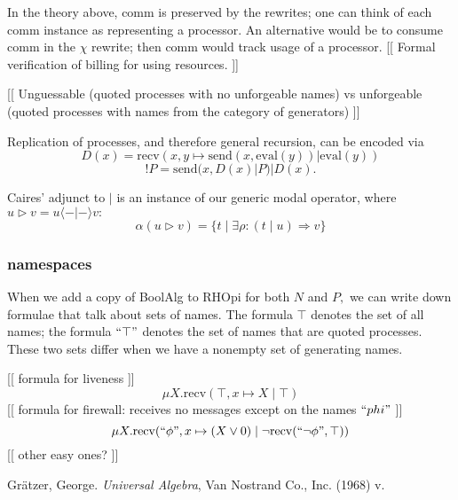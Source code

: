 \documentclass{article}
\newcommand{\maps}{\colon}
\newcommand{\send}{\mathrm{send}}
\newcommand{\recv}{\mathrm{recv}}
\renewcommand{\quote}[1]{``#1"}
\newcommand{\deref}[1]{\mathrm{eval}(#1)}
\begin{document}
In the theory above, comm is preserved by the rewrites; one can think of each comm instance as representing a processor.  An alternative would be to consume comm in the $\chi$ rewrite; then comm would track usage of a processor.  [[ Formal verification of billing for using resources. ]]

[[ Unguessable (quoted processes with no unforgeable names) vs unforgeable (quoted processes with names from the category of generators) ]]

Replication of processes, and therefore general recursion, can be encoded via
\[D(x) = \recv(x, y\mapsto \send(x, \deref{y}) | \deref{y})\]
\[!P = \send(x, D(x) | P) | D(x).\]

Caires' adjunct to $|$ is an instance of our generic modal operator, where $u \triangleright v = u \langle - | - \rangle v:$
\[ \alpha(u \triangleright v) = \{ t \;|\; \exists \rho\maps (t\;|\;u) \Rightarrow v\} \]

\subsubsection{namespaces}

When we add a copy of BoolAlg to RHOpi for both $N$ and $P,$ we can write down formulae that talk about sets of names.  The formula $\top$ denotes the set of all names; the formula $\quote{\top}$ denotes the set of names that are quoted processes.  These two sets differ when we have a nonempty set of generating names.

[[ formula for liveness ]]
\[ \mu X. \recv(\top, x \mapsto X\;|\;\top) \]
[[ formula for firewall: receives no messages except on the names $\quote{phi}$ ]]
\[ \mu X. \recv(\quote{\phi}, x \mapsto (X \lor 0)\;|\;\neg\recv(\quote{\neg \phi}, \top)) \]
[[ other easy ones? ]]

\begin{thebibliography}{99}
 Gr\"atzer, George. {\em Universal Algebra}, Van Nostrand Co., Inc. (1968) v.
\end{thebibliography}
\end{document}
